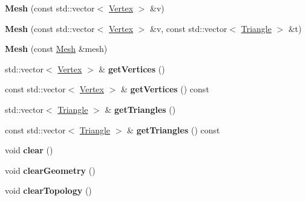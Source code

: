 \begin{DoxyCompactItemize}
\item 
\hypertarget{class_mesh_adb9316d7dace57df26ff1fe78b8f8c0a}{
{\bfseries Mesh} (const std::vector$<$ \hyperlink{class_vertex}{Vertex} $>$ \&v)}
\label{class_mesh_adb9316d7dace57df26ff1fe78b8f8c0a}

\item 
\hypertarget{class_mesh_a341fbc5393e30d8f391961e57d27f01f}{
{\bfseries Mesh} (const std::vector$<$ \hyperlink{class_vertex}{Vertex} $>$ \&v, const std::vector$<$ \hyperlink{class_triangle}{Triangle} $>$ \&t)}
\label{class_mesh_a341fbc5393e30d8f391961e57d27f01f}

\item 
\hypertarget{class_mesh_ad0260249329b621d4d91c66293baef8d}{
{\bfseries Mesh} (const \hyperlink{class_mesh}{Mesh} \&mesh)}
\label{class_mesh_ad0260249329b621d4d91c66293baef8d}

\item 
\hypertarget{class_mesh_a42f498162d3a1c2dc33673aaf0e13bbe}{
std::vector$<$ \hyperlink{class_vertex}{Vertex} $>$ \& {\bfseries getVertices} ()}
\label{class_mesh_a42f498162d3a1c2dc33673aaf0e13bbe}

\item 
\hypertarget{class_mesh_a012af8d734e4b24c9e4455460a309f39}{
const std::vector$<$ \hyperlink{class_vertex}{Vertex} $>$ \& {\bfseries getVertices} () const }
\label{class_mesh_a012af8d734e4b24c9e4455460a309f39}

\item 
\hypertarget{class_mesh_ad8028e3925807b895700685d20d8d068}{
std::vector$<$ \hyperlink{class_triangle}{Triangle} $>$ \& {\bfseries getTriangles} ()}
\label{class_mesh_ad8028e3925807b895700685d20d8d068}

\item 
\hypertarget{class_mesh_a0ed54e18cd41d1464e9856870c0517af}{
const std::vector$<$ \hyperlink{class_triangle}{Triangle} $>$ \& {\bfseries getTriangles} () const }
\label{class_mesh_a0ed54e18cd41d1464e9856870c0517af}

\item 
\hypertarget{class_mesh_a7008e23cbaacd2878b7e81a01ac5d96b}{
void {\bfseries clear} ()}
\label{class_mesh_a7008e23cbaacd2878b7e81a01ac5d96b}

\item 
\hypertarget{class_mesh_a1f53f5b1ea374096e87549bb34527627}{
void {\bfseries clearGeometry} ()}
\label{class_mesh_a1f53f5b1ea374096e87549bb34527627}

\item 
\hypertarget{class_mesh_aa23a3186392b0285ff3cd5577a58a7eb}{
void {\bfseries clearTopology} ()}
\label{class_mesh_aa23a3186392b0285ff3cd5577a58a7eb}


\end{DoxyCompactItemize}

